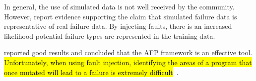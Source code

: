 In general, the use of simulated data is not well received by the community.
However, \citet{irrera2010,irrera2014} report evidence supporting the claim
that simulated failure data is representative of real failure data.  By
injecting faults, there is an increased likelihood potential failure types are
represented in the training data.

\citet{irrera2015} reported good results and concluded that the \ac{AFP}
framework is an effective tool.  \hl{Unfortunately, when using fault injection,
identifying the areas of a program that once mutated will lead to a failure is
extremely difficult}~\citep{irrera2010,kikuchi2014,natella2016assessing}.
